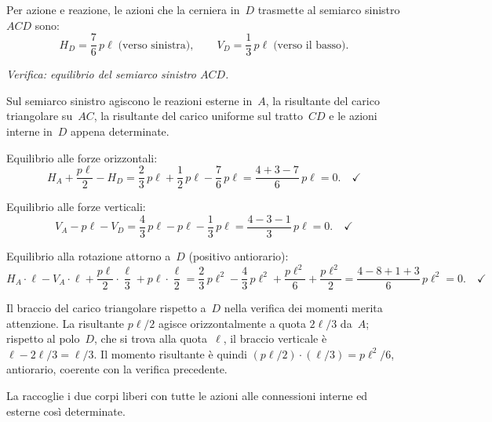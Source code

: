 Per azione e reazione, le azioni che la cerniera
in~$D$ trasmette al semiarco sinistro $ACD$ sono:
\[
H_D = \frac{7}{6}\,p\ell
\;\text{(verso sinistra)},
\qquad
V_D = \frac{1}{3}\,p\ell
\;\text{(verso il basso)}.
\]

\medskip
\noindent\textit{Verifica: equilibrio del semiarco
	sinistro $ACD$.}

Sul semiarco sinistro agiscono le reazioni esterne
in~$A$, la risultante del carico triangolare su~$AC$,
la risultante del carico uniforme sul tratto~$CD$
e le azioni interne in~$D$ appena determinate.

\noindent Equilibrio alle forze orizzontali:
\[
H_A + \frac{p\ell}{2} - H_D
= \frac{2}{3}\,p\ell + \frac{1}{2}\,p\ell - \frac{7}{6}\,p\ell
= \frac{4+3-7}{6}\,p\ell = 0.
\quad\checkmark
\]

\noindent Equilibrio alle forze verticali:
\[
V_A - p\ell - V_D
= \frac{4}{3}\,p\ell - p\ell - \frac{1}{3}\,p\ell
= \frac{4 - 3 - 1}{3}\,p\ell = 0.
\quad\checkmark
\]

\noindent Equilibrio alla rotazione attorno a~$D$
(positivo antiorario):
\[
H_A\cdot\ell - V_A\cdot\ell
+ \frac{p\ell}{2}\cdot\frac{\ell}{3}
+ p\ell\cdot\frac{\ell}{2}
= \frac{2}{3}\,p\ell^2 - \frac{4}{3}\,p\ell^2
+ \frac{p\ell^2}{6} + \frac{p\ell^2}{2}
= \frac{4-8+1+3}{6}\,p\ell^2 = 0.
\quad\checkmark
\]

\begin{oss}
	Il braccio del carico triangolare rispetto a~$D$
	nella verifica dei momenti merita attenzione.
	La risultante $p\ell/2$ agisce orizzontalmente
	a quota $2\ell/3$ da~$A$; rispetto al polo~$D$,
	che si trova alla quota~$\ell$, il braccio
	verticale è $\ell - 2\ell/3 = \ell/3$.
	Il momento risultante è quindi
	$(p\ell/2)\cdot(\ell/3) = p\ell^2/6$, antiorario,
	coerente con la verifica precedente.
\end{oss}

La  raccoglie i due
corpi liberi con tutte le azioni alle connessioni
interne ed esterne così determinate.


